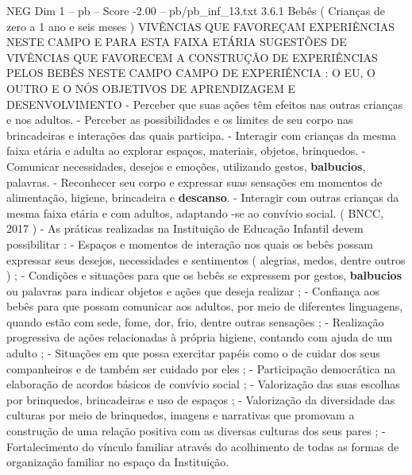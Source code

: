 \begin{textsample}{NEG Dim 1 – pb – Score -2.00 – pb/pb\_inf\_13.txt}  \label{ex:f1_neg_141}
3.6.1 Bebês ( Crianças de zero a 1 ano e seis meses ) VIVÊNCIAS QUE FAVOREÇAM EXPERIÊNCIAS NESTE CAMPO E PARA ESTA FAIXA ETÁRIA SUGESTÕES DE VIVÊNCIAS QUE FAVORECEM A CONSTRUÇÃO DE EXPERIÊNCIAS PELOS BEBÊS NESTE CAMPO CAMPO DE EXPERIÊNCIA : O EU, O OUTRO E O NÓS OBJETIVOS DE APRENDIZAGEM E DESENVOLVIMENTO - Perceber que suas ações têm efeitos nas outras crianças e nos adultos. - Perceber as possibilidades e os limites de seu corpo nas brincadeiras e interações das quais participa. - Interagir com crianças da mesma faixa etária e adulta ao explorar espaços, materiais, objetos, brinquedos. - Comunicar necessidades, desejos e emoções, utilizando gestos, \textbf{balbucios}, palavras. - Reconhecer seu corpo e expressar suas sensações em momentos de alimentação, higiene, brincadeira e \textbf{descanso}. - Interagir com outras crianças da mesma faixa etária e com adultos, adaptando -se ao convívio social. ( BNCC, 2017 ) - As práticas realizadas na Instituição de Educação Infantil devem possibilitar : - Espaços e momentos de interação nos quais os bebês possam expressar seus desejos, necessidades e sentimentos ( alegrias, medos, dentre outros ) ; - Condições e situações para que os bebês se expressem por gestos, \textbf{balbucios} ou palavras para indicar objetos e ações que deseja realizar ; - Confiança aos bebês para que possam comunicar aos adultos, por meio de diferentes linguagens, quando estão com sede, fome, dor, frio, dentre outras sensações ; - Realização progressiva de ações relacionadas à própria higiene, contando com ajuda de um adulto ; - Situações em que possa exercitar papéis como o de cuidar dos seus companheiros e de também ser cuidado por eles ; - Participação democrática na elaboração de acordos básicos de convívio social ; - Valorização das suas escolhas por brinquedos, brincadeiras e uso de espaços ; - Valorização da diversidade das culturas por meio de brinquedos, imagens e narrativas que promovam a construção de uma relação positiva com as diversas culturas dos seus pares ; - Fortalecimento do vínculo familiar através do acolhimento de todas as formas de organização familiar no espaço da Instituição.

\end{textsample}
